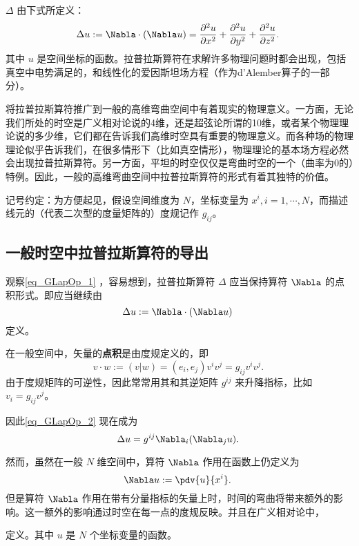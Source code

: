 
 $\Delta$ 由下式所定义：
\begin{equation}\label{eq_GLapOp_1}
\Delta u:=\Nabla\cdot (\Nabla u)=\frac{\partial^{2}{u}}{\partial{x}^{2}} + \frac{\partial^{2}{u}}{\partial{y}^{2}} + \frac{\partial^{2}{u}}{\partial{z}^{2}}.~
\end{equation}
其中 $u$ 是空间坐标的函数。拉普拉斯算符在求解许多物理问题时都会出现，包括真空中电势满足的，和线性化的爱因斯坦场方程（作为d'Alember算子的一部分）。

将拉普拉斯算符推广到一般的高维弯曲空间中有着现实的物理意义。一方面，无论我们所处的时空是广义相对论说的4维，还是超弦论所谓的10维，或者某个物理理论说的多少维，它们都在告诉我们高维时空具有重要的物理意义。而各种场的物理理论似乎告诉我们，在很多情形下（比如真空情形），物理理论的基本场方程必然会出现拉普拉斯算符。另一方面，平坦的时空仅仅是弯曲时空的一个（曲率为0的）特例。因此，一般的高维弯曲空间中拉普拉斯算符的形式有着其独特的价值。

记号约定：为方便起见，假设空间维度为 $N$，坐标变量为 $x^i,i=1,\cdots,N$，而描述线元的（代表二次型的度量矩阵的）度规记作 $g_{ij}$。

\subsection{一般时空中拉普拉斯算符的导出}
观察\autoref{eq_GLapOp_1} ，容易想到，拉普拉斯算符 $\Delta$ 应当保持算符 $\Nabla$ 的点积形式。即应当继续由
\begin{equation}\label{eq_GLapOp_2}
\Delta u:=\Nabla\cdot (\Nabla u)~
\end{equation}
定义。

在一般空间中，矢量的\textbf{点积}是由度规定义的，即
\begin{equation}
v\cdot w:=(v|w)=(e_i,e_j)v^iv^j=g_{ij}v^iv^j.~
\end{equation}
由于度规矩阵的可逆性，因此常常用其和其逆矩阵 $g^{ij}$ 来升降指标，比如 $v_i=g_{ij}v^j$。

因此\autoref{eq_GLapOp_2} 现在成为
\begin{equation}
\Delta u=g^{ij}\Nabla_i(\Nabla_j u).~
\end{equation}

然而，虽然在一般 $N$ 维空间中，算符 $\Nabla$ 作用在函数上仍定义为
\begin{equation}
\Nabla u:=\pdv{u}{x^i}.~
\end{equation}
但是算符 $\Nabla$ 作用在带有分量指标的矢量上时，时间的弯曲将带来额外的影响。这一额外的影响通过时空在每一点的度规反映。并且在广义相对论中，

定义。其中 $u$ 是 $N$ 个坐标变量的函数。






